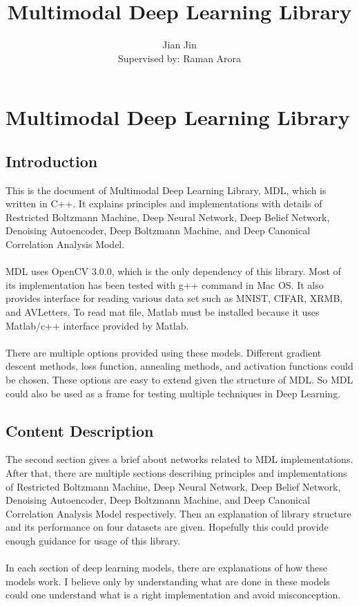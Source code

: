 \documentclass[12pt]{article}
\begin{document}
\title{\vspace{40mm}Multimodal Deep Learning Library}
\author[]{Jian Jin\\{\small Supervised by: Raman Arora}}
\maketitle
\thispagestyle{empty} 

\newpage
\tableofcontents
\newpage

\section{Multimodal Deep Learning Library}
\subsection{Introduction}
This is the document of Multimodal Deep Learning Library, MDL, which is written in C++. It explains principles and implementations with details of Restricted Boltzmann Machine, Deep Neural Network, Deep Belief Network, Denoising Autoencoder, Deep Boltzmann Machine, and Deep Canonical Correlation Analysis Model.\\
\\
MDL uses OpenCV 3.0.0, which is the only dependency of this library. Most of its implementation has been tested with g++ command in Mac OS. It also provides interface for reading various data set such as MNIST, CIFAR, XRMB, and AVLetters. To read mat file, Matlab must be installed because it uses Matlab/c++ interface provided by Matlab.\\
\\
There are multiple options provided using these models. Different gradient descent methods, loss function, annealing methods, and activation functions could be chosen. These options are easy to extend given the structure of MDL. So MDL could also be used as a frame for testing multiple techniques in Deep Learning.
\subsection{Content Description}
The second section gives a brief about networks related to MDL implementations. After that, there are multiple sections describing principles and implementations of Restricted Boltzmann Machine, Deep Neural Network, Deep Belief Network, Denoising Autoencoder, Deep Boltzmann Machine, and Deep Canonical Correlation Analysis Model respectively. Then an explanation of library structure and its performance on four datasets are given. Hopefully this could provide enough guidance for usage of this library.\\
\\
In each section of deep learning models, there are explanations of how these models work. I believe only by understanding what are done in these models could one understand what is a right implementation and avoid misconception.
\clearpage
\end{document}
